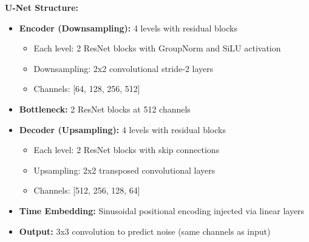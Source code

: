 \documentclass[a4paper,12pt]{article}
\begin{document}
\textbf{U-Net Structure:}
\begin{itemize}
    \item \textbf{Encoder (Downsampling):} 4 levels with residual blocks
        \begin{itemize}
            \item Each level: 2 ResNet blocks with GroupNorm and SiLU activation
            \item Downsampling: 2x2 convolutional stride-2 layers
            \item Channels: [64, 128, 256, 512]
        \end{itemize}
    \item \textbf{Bottleneck:} 2 ResNet blocks at 512 channels
    \item \textbf{Decoder (Upsampling):} 4 levels with residual blocks
        \begin{itemize}
            \item Each level: 2 ResNet blocks with skip connections
            \item Upsampling: 2x2 transposed convolutional layers
            \item Channels: [512, 256, 128, 64]
        \end{itemize}
    \item \textbf{Time Embedding:} Sinusoidal positional encoding injected via linear layers
    \item \textbf{Output:} 3x3 convolution to predict noise (same channels as input)
\end{itemize}
\end{document}
